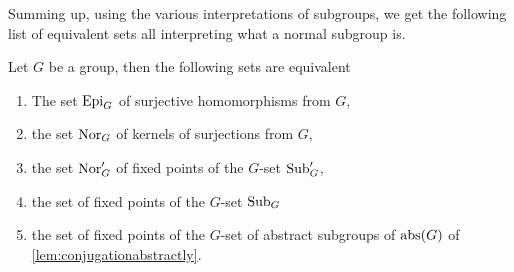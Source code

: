 Summing up, using the various interpretations of subgroups, we get the following list of equivalent sets all interpreting what a normal subgroup is.  
\begin{lemma}
  \label{lem:characterizations of normal}
  Let $G$ be a group, then the following sets are equivalent
\begin{enumerate}
\item The set $\mathrm{Epi}_G$ of surjective homomorphisms from $G$,
\item the set $\mathrm{Nor}_G$ of kernels of surjections from $G$,
\item the set $\mathrm{Nor}_G'$ of fixed points of the $G$-set $\mathrm{Sub}_G'$,
\item the set of fixed points of the $G$-set $\mathrm{Sub}_G$
\item the set of fixed points of the $G$-set of abstract subgroups of $\mathrm{abs}(G)$ of \cref{lem:conjugationabstractly}.
\end{enumerate}
\end{lemma}





